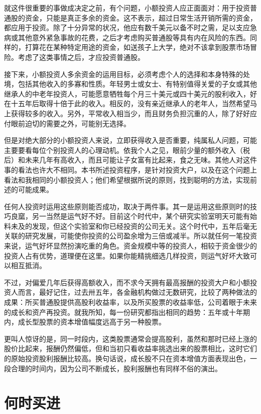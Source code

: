 \documentclass[UTF8,a4paper,zihao=-4,fontset = windows]{ctexart} %
\begin{document}
就这件很重要的事做成决定之前，有个问题，小额投资人应正面面对：用于投资普通股的资金，只能是真正多余的资金。这不表示，超过日常生活开销所需的资金，都应用于投资。除了十分异常的状况，他应有数千美元以备不时之需，足以支应急病或其他意外紧急事故的花费，之后才考虑购买普通股等具有内在风险的东西。同样的，打算花在某种特定用途的资金，如送孩子上大学，绝对不该拿到股票市场冒险。考虑了这类事情之后，才应投资普通股。

接下来，小额投资人多余资金的运用目标，必须考虑个人的选择和本身特殊的处境，包括其他收入的多寡和性质。年轻男士或女士、有特别值得关爱的子女或其他继承人的中老年投资人，可能愿意牺牲每个月三十美元或四十美元的股利收入，好在十五年后取得十倍于此的收入。相反的，没有亲近继承人的老年人，当然希望马上获得较多的收入。另外，平常收入相当少，而且财务负担沉重的人，除了好好应付眼前迫切的需要之外，可能别无选择。

但是对绝大部分的小额投资人来说，立即获得收入是否重要，纯属私人问题，可能主要要看每位个别投资人的心理动机。依我个人之见，眼前少量的额外收入（税后）和未来几年有高收入，而且可能让子女富有比起来，食之无味。其他人对这件事的看法也许大不相同。本书所述投资程序，是针对投资大户，以及在这个问题上看法和我相同的小额投资人；他们希望根据所说的原则，找到聪明的方法，实现前述的可能成果。

任何人投资时运用这些原则能否成功，取决于两件事。其一是运用这些原则时的技巧良窳，另一当然是运气好不好。目前这个时代中，某个研究实验室明天可能有始料未及的发现，但这个实验室和你已经投资的公司无关。这个时代中，五年后毫无关联的研究发展，可能使你投资的公司盈余增为三倍或减半。所以就任何一笔投资来说，运气好坏显然扮演吃重的角色。资金规模中等的投资人，相较于资金很少的投资人占有优势，道理便在这里。如果你能精挑细选几样投资，则运气好坏大致可以相互抵消。

不过，对偏爱几年后获得高额收入，而不求今天拥有最高报酬的投资大户和小额投资人而言，最好记住，过去卅五年，各金融机构做过无数研究，比较了两种做法的成果：所买普通股提供高股利收益率，以及所买股票的收益率低，公司着眼于未来的成长和资产再投资。就我所知，每一份研究都指出相同的趋势：五年或十年期内，成长型股票的资本增值幅度远高于另一种股票。

更叫人惊讶的是，同一时段内，这类股票通常会提高股利，虽然和那时已经上涨的股价比起来，报酬仍然偏低，但和当初只看收益率挑选出来的股票相比，这时它们的原始投资股利报酬比较高。换句话说，成长股不只在资本增值方面表现出色，一段合理的时间内，因为公司不断成长，股利报酬也有同样不俗的演出。

\section{何时买进}
\end{document}
